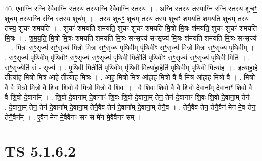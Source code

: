 \documentclass[17pt]{extarticle}
\begin{document}
40. ए॒वाग्नि र॒ग्नि रे॒वैवाग्नि स्तस्य॒ तस्या॒ग्नि रे॒वैवाग्नि स्तस्य॑ । . अ॒ग्नि स्तस्य॒ तस्या॒ग्नि र॒ग्नि स्तस्य॒ शुचꣳ॒॒ शुच॒म् तस्या॒ग्नि र॒ग्नि स्तस्य॒ शुच᳚म् । . तस्य॒ शुचꣳ॒॒ शुच॒म् तस्य॒ तस्य॒ शुचꣳ॑ शमयति शमयति॒ शुच॒म् तस्य॒ तस्य॒ शुचꣳ॑ शमयति । . शुचꣳ॑ शमयति शमयति॒ शुचꣳ॒॒ शुचꣳ॑ शमयति मि॒त्रो मि॒त्रः श॑मयति॒ शुचꣳ॒॒ शुचꣳ॑ शमयति मि॒त्रः । . श॒म॒य॒ति॒ मि॒त्रो मि॒त्रः श॑मयति शमयति मि॒त्रः सꣳ॒॒सृज्य॑ सꣳ॒॒सृज्य॑ मि॒त्रः श॑मयति शमयति मि॒त्रः सꣳ॒॒सृज्य॑ । . मि॒त्रः सꣳ॒॒सृज्य॑ सꣳ॒॒सृज्य॑ मि॒त्रो मि॒त्रः सꣳ॒॒सृज्य॑ पृथि॒वीम् पृ॑थि॒वीꣳ सꣳ॒॒सृज्य॑ मि॒त्रो मि॒त्रः सꣳ॒॒सृज्य॑ पृथि॒वीम् । . सꣳ॒॒सृज्य॑ पृथि॒वीम् पृ॑थि॒वीꣳ सꣳ॒॒सृज्य॑ सꣳ॒॒सृज्य॑ पृथि॒वी मितीति॑ पृथि॒वीꣳ सꣳ॒॒सृज्य॑ सꣳ॒॒सृज्य॑ पृथि॒वी मिति॑ । . सꣳ॒॒सृज्येति॑ सं - सृज्य॑ । . पृ॒थि॒वी मितीति॑ पृथि॒वीम् पृ॑थि॒वी मित्या॑हा॒हेति॑ पृथि॒वीम् पृ॑थि॒वी मित्या॑ह । . इत्या॑हा॒हे तीत्या॑ह मि॒त्रो मि॒त्र आ॒हे तीत्या॑ह मि॒त्रः । . आ॒ह॒ मि॒त्रो मि॒त्र आ॑हाह मि॒त्रो वै वै मि॒त्र आ॑हाह मि॒त्रो वै । . मि॒त्रो वै वै मि॒त्रो मि॒त्रो वै शि॒वः शि॒वो वै मि॒त्रो मि॒त्रो वै शि॒वः । . वै शि॒वः शि॒वो वै वै शि॒वो दे॒वाना᳚म् दे॒वानाꣳ॑ शि॒वो वै वै शि॒वो दे॒वाना᳚म् । . शि॒वो दे॒वाना᳚म् दे॒वानाꣳ॑ शि॒वः शि॒वो दे॒वाना॒म् तेन॒ तेन॑ दे॒वानाꣳ॑ शि॒वः शि॒वो दे॒वाना॒म् तेन॑ । . दे॒वाना॒म् तेन॒ तेन॑ दे॒वाना᳚म् दे॒वाना॒म् तेनै॒वैव तेन॑ दे॒वाना᳚म् दे॒वाना॒म् तेनै॒व । . तेनै॒वैव तेन॒ तेनै॒वैन॑ मेन मे॒व तेन॒ तेनै॒वैन᳚म् । . ए॒वैन॑ मेन मे॒वैवैनꣳ॒॒ सꣳ स मे॑न मे॒वैवैनꣳ॒॒ सम् । \newline
\pagebreak
{}

\section{ TS 5.1.6.2 }
\end{document}
